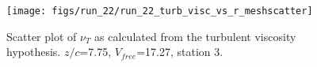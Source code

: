 \begin{figure}[H]
\centering
\texttt{[image: figs/run\_22/run\_22\_turb\_visc\_vs\_r\_meshscatter]}
\caption{Scatter plot of $\nu_T$ as calculated from the turbulent viscosity hypothesis. $z/c$=7.75, $V_{free}$=17.27, station 3.}
\label{fig:run_22_turb_visc_vs_r_meshscatter}
\end{figure}


